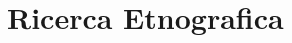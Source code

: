 \documentclass[../Report.tex]{subfiles}
\begin{document}
    \chapter{Ricerca Etnografica}
\end{document}
